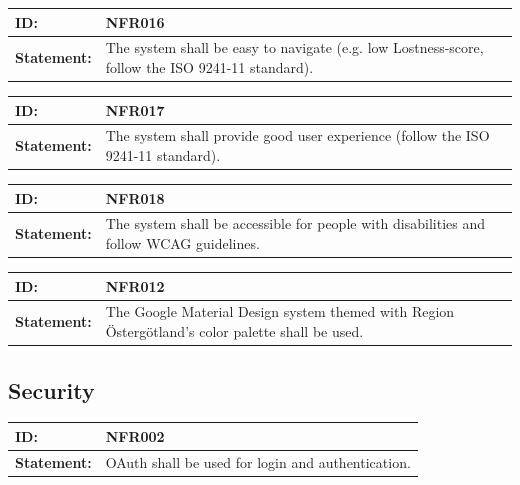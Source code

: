 \documentclass{scrreprt}
\begin{document}
\begin{center}
\begin{tabularx}{\linewidth}{| l | X |}
 \hline
 \textbf{ID:} & NFR016  \\ 
 \hline
 \textbf{Statement:} & The system shall be easy to navigate (e.g. low Lostness-score, follow the ISO 9241-11 standard).
 \\ 
 \hline
\end{tabularx}
\end{center}

\begin{center}
\begin{tabularx}{\linewidth}{| l | X |}
 \hline
 \textbf{ID:} & NFR017  \\ 
 \hline
 \textbf{Statement:} & The system shall provide good user experience (follow the ISO 9241-11 standard).
 \\ 
 \hline
\end{tabularx}
\end{center}

\begin{center}
\begin{tabularx}{\linewidth}{| l | X |}
 \hline
 \textbf{ID:} & NFR018  \\ 
 \hline
 \textbf{Statement:} & The system shall be accessible for people with disabilities and follow WCAG guidelines. 
 \\ 
 \hline
\end{tabularx}
\end{center}

\begin{center}
\begin{tabularx}{\linewidth}{| l | X |}
 \hline
 \textbf{ID:} & NFR012  \\ 
 \hline
 \textbf{Statement:} & The Google Material Design system themed with Region Östergötland’s color palette shall be used.
 \\ 
 \hline
\end{tabularx}
\end{center}

\subsection{Security}

\begin{center}
\begin{tabularx}{\linewidth}{| l | X |}
 \hline
 \textbf{ID:} & NFR002  \\ 
 \hline
 \textbf{Statement:} & OAuth shall be used for login and authentication.
 \\ 
 \hline
\end{tabularx}
\end{center}
\end{document}
